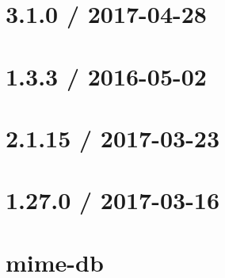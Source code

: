 \documentclass[twoside]{book}
\newcommand{\+}{\discretionary{\mbox{\scriptsize$\hookleftarrow$}}{}{}}
\begin{document}
\chapter{3.1.0 / 2017-\/04-\/28}
\label{md_bin_node_modules_socket_8io_node_modules_engine_8io__history}

\chapter{1.3.3 / 2016-\/05-\/02}
\label{md_bin_node_modules_socket_8io_node_modules_engine_8io_node_modules_accepts__h_i_s_t_o_r_y}

\chapter{2.1.15 / 2017-\/03-\/23}
\label{md_bin_node_modules_socket_8io_node_modules_engine_8io_node_modules_accepts_node_modules_mime-types__h_i_s_t_o_r_y}

\chapter{1.27.0 / 2017-\/03-\/16}
\label{md_bin_node_modules_socket_8io_node_modules_engine_8io_node_modules_accepts_node_modules_mime-ty13fdcb6f3e1b0578a1263f39fc23f315}

\chapter{mime-\/db}
\label{md_bin_node_modules_socket_8io_node_modules_engine_8io_node_modules_accepts_node_modules_mime-tyc61a1d3ea1ff7baa9d4519375ee1ad44}

\end{document}
